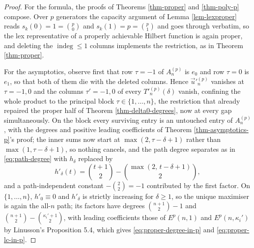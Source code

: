 \documentclass[11pt, a4paper, abstract=yes]{scrartcl}
\theoremstyle{definition}
\theoremstyle{remark}
\theoremstyle{plain}
\newcommand{\indeg}{\operatorname{indeg}}
\begin{document}
\begin{proof}
For the formula, the proofs of Theorems \ref{thm-proper} and \ref{thm-poly-p} compose. Over \(p\)
generators the capacity argument of Lemma \ref{lem-lexproper} reads \(s_k(0)=1=\binom p0\) and
\(s_k(1)=p=\binom p1\) and goes through verbatim, so the lex representative of a properly
achievable Hilbert function is again proper, and deleting the \(\indeg\le1\) columns implements
the restriction, as in Theorem \ref{thm-proper}.

For the asymptotics, observe first that row \(\tau=-1\) of \(A^{(p)}_n\) is \(e_0\) and row
\(\tau=0\) is \(e_1\), so that both of them die with the deleted columns. Hence \(\vec u'^{(p)}_n\) vanishes at \(\tau=-1,0\) and the columns
\(\tau'=-1,0\) of every \(T'^{(p)}_n(\delta)\) vanish, confining the whole product to the principal
block \(\tau\in\lbrace1,\dots,n\rbrace\), the restriction that already repaired the proper half of
Theorem \ref{thm-delta0-degrees}, now at every gap simultaneously. On the block every surviving
entry is an untouched entry of \(A^{(p)}_n\), with the degrees and positive leading coefficients of
Theorem \ref{thm-asymptotics-p}'s proof; the inner sums now start at \(\max(2,\tau-\delta+1)\)
rather than \(\max(1,\tau-\delta+1)\), so nothing cancels, and the path degree separates as in
\eqref{eq:path-degree} with \(h_\delta\) replaced by
\begin{equation}\label{eq:h-prime}
  h'_\delta(t)=\binom{t+1}{2}-\binom{\max(2,\,t-\delta+1)}{2} ,
\end{equation}
and a path-independent constant \(-\binom22=-1\) contributed by the first factor. On \(\lbrace1,\dots,n\rbrace\), \(h'_0\equiv0\) and \(h'_\delta\)
is strictly increasing for \(\delta\ge1\), so the unique maximiser is again the all-\(n\) path;
its factors have degrees \(\binom{n+1}{2}-1\) and \(\binom{n+1}{2}-\binom{\kappa_i'+1}{2}\), with leading
coefficients those of \(E^p(n,1)\) and \(E^p(n,\kappa_i')\) by Linusson's Proposition 5.4, which
gives \eqref{eq:proper-degree-in-p} and \eqref{eq:proper-lc-in-p}.
\end{proof}
\end{document}
